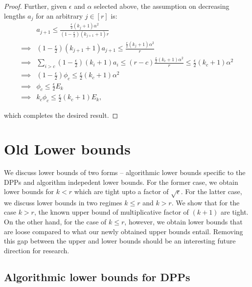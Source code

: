 \documentclass{article}
\begin{document}
\begin{proof}
	Further, given $\epsilon$ and $\alpha$ selected above, the assumption on decreasing lengths $a_j$ for an arbitrary $j \in [r]$ is: 
	\begin{align*}
	&  a_{j+1} \leq \frac{\frac{\epsilon}{2} (k_j+1) \alpha^2 }{(1-\frac{\epsilon}{2}) (k_{j+1}+1)r}\\
	\implies & (1-\frac{\epsilon}{2}) (k_{j+1}+1) a_{j+1} \leq \frac{\frac{\epsilon}{2} (k_j+1) \alpha^2 }{r}\\
	\implies & \sum_{i>c}(1-\frac{\epsilon}{2}) (k_{i}+1) a_{i} \leq (r-c)\frac{\frac{\epsilon}{2} (k_c+1) \alpha^2 }{r} \leq \frac{\epsilon}{2} (k_c+1) \alpha^2\\
	\implies & (1-\frac{\epsilon}{2})\phi_c  \leq  \frac{\epsilon}{2} (k_c+1) \alpha^2 \\
	\implies & \phi_c \leq \frac{\epsilon}{2} E_k \\
	\implies & k_c\phi_c \leq \frac{\epsilon}{2} (k_c+1) E_k,
	\end{align*}
	
	which completes the desired result.
	
	
	

	
\end{proof}


\section{Old Lower bounds}

 We discuss lower bounds of two forms -- algorithmic lower bounds specific to the DPPs and algorithm indepedent lower bounds. For the former case, we obtain lower bounds for $k<r$ which are tight upto a factor of $\sqrt{\epsilon}$. For the latter case, we discuss lower bounds in two regimes $k\leq r$ and $k>r$. We show that for the case $k>r$, the known upper bound of multiplicative factor of $(k+1)$ are tight. On the other hand, for the case of $k\leq r$, however, we obtain lower bounds that are loose compared to what our newly obtained upper bounds entail. Removing this gap between the upper and lower bounds should be an interesting future direction for research.
 
 \subsection{Algorithmic lower bounds for DPPs} 
  
\end{document}
